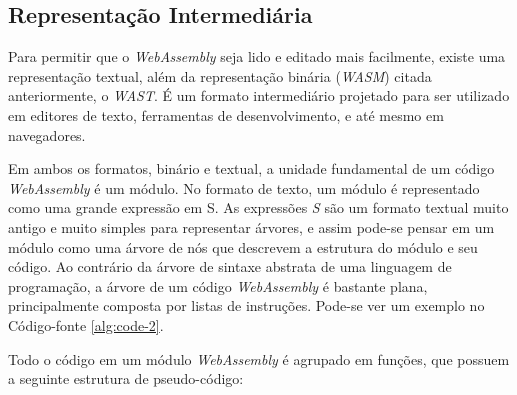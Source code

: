 \begin{figure}[h!]
    \centering
\end{figure}

\subsection{Representação Intermediária}
\label{ssec:wa-ir}

Para permitir que o \textit{WebAssembly} seja lido e editado mais facilmente, existe uma
representação textual, além da representação binária (\textit{WASM}) citada anteriormente,
o \textit{WAST}. É um formato intermediário projetado para ser utilizado em editores de
texto, ferramentas de desenvolvimento, e até mesmo em navegadores.

Em ambos os formatos, binário e textual, a unidade fundamental de um código
\textit{WebAssembly} é um módulo. No formato de texto, um módulo é representado como uma
grande expressão em S. As expressões \textit{S} são um formato textual muito antigo e
muito simples para representar árvores, e assim pode-se pensar em um módulo como uma
árvore de nós que descrevem a estrutura do módulo e seu código. Ao contrário da árvore de
sintaxe abstrata de uma linguagem de programação, a árvore de um código
\textit{WebAssembly} é bastante plana, principalmente composta por listas de instruções.
Pode-se ver um exemplo no Código-fonte \ref{alg:code-2}.



Todo o código em um módulo \textit{WebAssembly} é agrupado em funções, que possuem a
seguinte estrutura de pseudo-código:



